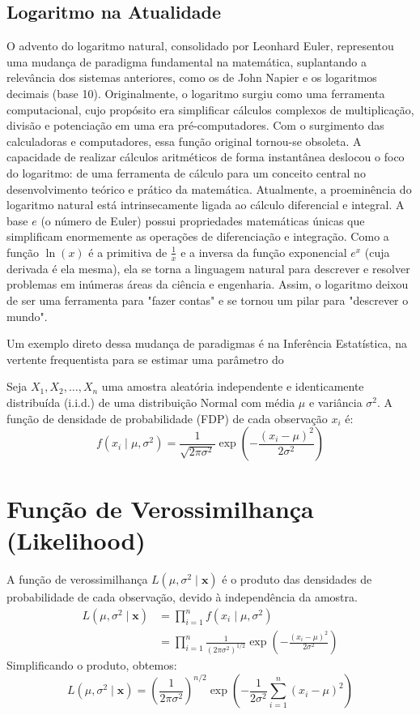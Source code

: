 \subsection{Logaritmo na Atualidade}

O advento do logaritmo natural, consolidado por Leonhard Euler, representou uma mudança de paradigma fundamental na matemática, suplantando a relevância dos sistemas anteriores, como os de John Napier e os logaritmos decimais (base 10). Originalmente, o logaritmo surgiu como uma ferramenta computacional, cujo propósito era simplificar cálculos complexos de multiplicação, divisão e potenciação em uma era pré-computadores. Com o surgimento das calculadoras e computadores, essa função original tornou-se obsoleta. A capacidade de realizar cálculos aritméticos de forma instantânea deslocou o foco do logaritmo: de uma ferramenta de cálculo para um conceito central no desenvolvimento teórico e prático da matemática. Atualmente, a proeminência do logaritmo natural está intrinsecamente ligada ao cálculo diferencial e integral. A base $e$ (o número de Euler) possui propriedades matemáticas únicas que simplificam enormemente as operações de diferenciação e integração. Como a função $\ln(x)$ é a primitiva de $\frac{1}{x}$ e a inversa da função exponencial $e^x$ (cuja derivada é ela mesma), ela se torna a linguagem natural para descrever e resolver problemas em inúmeras áreas da ciência e engenharia. Assim, o logaritmo deixou de ser uma ferramenta para "fazer contas" e se tornou um pilar para "descrever o mundo".

Um exemplo direto dessa mudança de paradigmas é na Inferência Estatística, na vertente frequentista para se estimar uma parâmetro do 

Seja $X_1, X_2, \ldots, X_n$ uma amostra aleatória independente e identicamente distribuída (i.i.d.) de uma distribuição Normal com média $\mu$ e variância $\sigma^2$. A função de densidade de probabilidade (FDP) de cada observação $x_i$ é:
\[
f(x_i \mid \mu, \sigma^2) = \frac{1}{\sqrt{2\pi\sigma^2}} \exp\left( -\frac{(x_i-\mu)^2}{2\sigma^2} \right)
\]

\section{Função de Verossimilhança (Likelihood)}
A função de verossimilhança $L(\mu, \sigma^2 \mid \mathbf{x})$ é o produto das densidades de probabilidade de cada observação, devido à independência da amostra.
\begin{align*}
    L(\mu, \sigma^2 \mid \mathbf{x}) &= \prod_{i=1}^{n} f(x_i \mid \mu, \sigma^2) \\
                                   &= \prod_{i=1}^{n} \frac{1}{(2\pi\sigma^2)^{1/2}} \exp\left( -\frac{(x_i-\mu)^2}{2\sigma^2} \right)
\end{align*}
Simplificando o produto, obtemos:
\[
L(\mu, \sigma^2 \mid \mathbf{x}) = \left( \frac{1}{2\pi\sigma^2} \right)^{n/2} \exp\left( -\frac{1}{2\sigma^2} \sum_{i=1}^{n} (x_i-\mu)^2 \right)
\]

